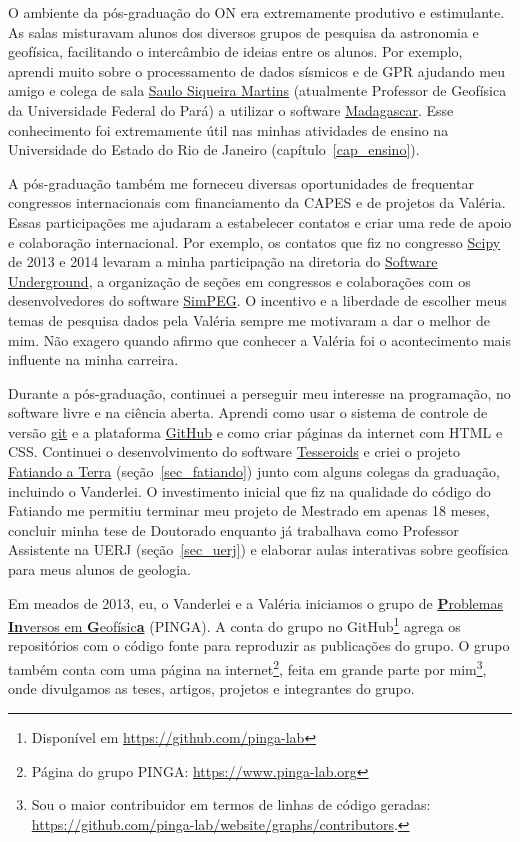 \documentclass[10pt,a4paper,oneside]{book}
\newcommand{\UERJ}{Universidade do Estado do Rio de Janeiro}
\begin{document}
O ambiente da pós-graduação do ON era extremamente produtivo e estimulante.
As salas misturavam alunos dos diversos grupos de pesquisa da astronomia e
geofísica, facilitando o intercâmbio de ideias entre os alunos.
Por exemplo, aprendi muito sobre o processamento de dados sísmicos e de GPR
ajudando meu amigo e colega de sala
\href{https://www.linkedin.com/in/saulo-siqueira-martins-78770878/}{Saulo Siqueira Martins}
(atualmente Professor de Geofísica da Universidade Federal do Pará)
a utilizar o software \href{https://www.reproducibility.org/}{Madagascar}.
Esse conhecimento foi extremamente útil nas minhas atividades de ensino na
\UERJ{} (capítulo~\ref{cap_ensino}).

A pós-graduação também me forneceu diversas oportunidades de frequentar
congressos internacionais com financiamento da CAPES e de projetos da Valéria.
Essas participações me ajudaram a estabelecer contatos e criar uma rede de
apoio e colaboração internacional.
Por exemplo, os contatos que fiz no congresso
\href{https://conference.scipy.org/scipy2014/}{Scipy} de 2013 e 2014 levaram a
minha participação na diretoria do
\href{https://softwareunderground.org/}{Software Underground}, a organização
de seções em congressos e colaborações com os desenvolvedores do software
\href{https://simpeg.xyz/}{SimPEG}.
O incentivo e a liberdade de escolher meus temas de pesquisa dados pela Valéria
sempre me motivaram a dar o melhor de mim.
Não exagero quando afirmo que conhecer a Valéria foi o acontecimento mais
influente na minha carreira.

Durante a pós-graduação, continuei a perseguir meu interesse na programação,
no software livre e na ciência aberta.
Aprendi como usar o sistema de controle de versão
\href{https://git-scm.com/}{git} e a plataforma
\href{https://github.com}{GitHub} e como criar páginas da internet com HTML e
CSS.
Continuei o desenvolvimento do software \href{https://tesseroids.leouieda.com/}{Tesseroids}
e criei o projeto \href{https://www.fatiando.org}{Fatiando a Terra}
(seção~\ref{sec_fatiando}) junto com alguns colegas da graduação, incluindo o
Vanderlei.
O investimento inicial que fiz na qualidade do código do Fatiando me
permitiu terminar meu projeto de Mestrado em apenas 18 meses,
concluir minha tese de Doutorado enquanto já trabalhava como Professor
Assistente na UERJ (seção~\ref{sec_uerj}) e elaborar aulas interativas sobre
geofísica para meus alunos de geologia.

Em meados de 2013, eu, o Vanderlei e a Valéria iniciamos o grupo de
\href{https://www.pinga-lab.org/}{\textbf{P}roblemas \textbf{In}versos em \textbf{G}eofísic\textbf{a}}
(PINGA).
A conta do grupo no GitHub\footnote{Disponível em \url{https://github.com/pinga-lab}}
agrega os repositórios com o código fonte para reproduzir as publicações do
grupo.
O grupo também conta com uma página na internet\footnote{Página do grupo PINGA: \url{https://www.pinga-lab.org}},
feita em grande parte por mim\footnote{Sou o maior contribuidor em termos de
linhas de código geradas:
\url{https://github.com/pinga-lab/website/graphs/contributors}.},
onde divulgamos as teses, artigos, projetos e integrantes do grupo.
\end{document}

